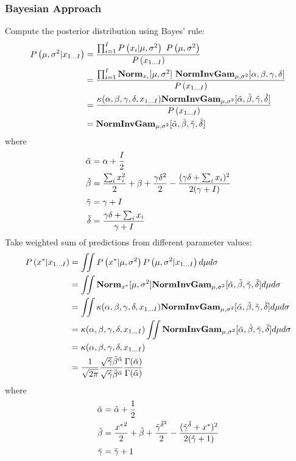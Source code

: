 \subsubsection*{Bayesian Approach}
Compute the posterior distribution using Bayes' rule:
	\begin{align*}
	\P{\mu,\si^2|x_{1\dots I}}&=\frac{\prod_{i=1}^I\P{x_i|\mu,\si^2}\ \P{\mu,\si^2}}{\P{x_{1\dots I}}} \\
	&=\frac{\prod_{i=1}^I\Norm_{x_i}[\mu,\si^2]\ \NIG_{\mu,\si^2}[\al,\be,\ga,\de]}{\P{x_{1\dots I}}} \\
	&=\frac{\ka(\al,\be,\ga,\de,x_{1\dots I})\NIG_{\mu,\si^2}[\ti{\al},\ti{\be},\ti{\ga},\ti{\de}]}{\P{x_{1\dots I}}} \\
	&=\NIG_{\mu,\si^2}[\ti{\al},\ti{\be},\ti{\ga},\ti{\de}]
	\end{align*}
where
	\begin{align*}
	\tilde{\alpha}&=\alpha+\frac{I}{2} \\
	\tilde{\beta}&=\frac{\sum_ix_i^2}{2}+\beta+\frac{\gamma\delta^2}{2}-\frac{(\gamma\delta+\sum_ix_i)^2}{2(\gamma+I)} \\
	\tilde{\gamma}&=\gamma+I \\
	\tilde{\delta}&=\frac{\gamma\delta+\sum_ix_i}{\gamma+I}
	\end{align*}
Take weighted sum of predictions from different parameter values:
	\begin{align*}
	P\left(x^*|x_{1\dots I}\right)&=\iint P\left(x^*|\mu,\sigma^2\right)P\left(\mu,\sigma^2|x_{1\dots I}\right)d\mu d\sigma \\
	&=\iint\mathbf{Norm}_{x^*}[\mu,\sigma^2]\mathbf{NormInvGam}_{\mu,\sigma^2}[\tilde{\alpha},\tilde{\beta},\tilde{\gamma},\tilde{\delta}]d\mu d\sigma \\
	&=\iint\kappa(\alpha,\beta,\gamma,\delta,x_{1\dots I})\mathbf{NormInvGam}_{\mu,\sigma^2}[\breve{\alpha},\breve{\beta},\breve{\gamma},\breve{\delta}]d\mu d\sigma \\
	&=\kappa(\alpha,\beta,\gamma,\delta,x_{1\dots I})\iint\mathbf{NormInvGam}_{\mu,\sigma^2}[\breve{\alpha},\breve{\beta},\breve{\gamma},\breve{\delta}]d\mu d\sigma \\
	&=\kappa(\alpha,\beta,\gamma,\delta,x_{1\dots I}) \\
	&=\frac{1}{\sqrt{2\pi}}\frac{\sqrt{\tilde{\gamma}}\tilde{\beta}^{\tilde{\alpha}}}{\sqrt{\breve{\gamma}}\breve{\beta}^{\breve{\alpha}}}\frac{\Gamma(\breve{\alpha})}{\Gamma(\tilde{\alpha})}
	\end{align*}
where
	\begin{align*}
	\breve{\alpha}&=\tilde{\alpha}+\frac{1}{2} \\
	\breve{\beta}&=\frac{{x^*}^2}{2}+\tilde{\beta}+\frac{\tilde{\gamma}^{\tilde{\delta}^2}}{2}-\frac{(\tilde{\gamma}^{\tilde{\delta}}+x^*)^2}{2(\tilde{\gamma}+1)} \\
	\breve{\gamma}&=\tilde{\gamma}+1
	\end{align*}

